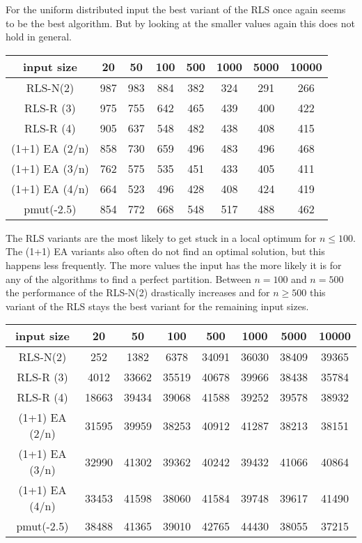 For the uniform distributed input the best variant of the RLS once again seems to be the best algorithm.
But by looking at the smaller values again this does not hold in general.

\begin{tabular}[h]{cccccccc}
      input size    & 20  & 50  & 100 & 500 & 1000 & 5000 & 10000 \\\hline
      RLS-N(2)      & 987 & 983 & 884 & 382 & 324  & 291  & 266   \\
      RLS-R (3)      & 975 & 755 & 642 & 465 & 439  & 400  & 422   \\
      RLS-R (4)      & 905 & 637 & 548 & 482 & 438  & 408  & 415   \\
      (1+1) EA (2/n) & 858 & 730 & 659 & 496 & 483  & 496  & 468   \\
      (1+1) EA (3/n) & 762 & 575 & 535 & 451 & 433  & 405  & 411   \\
      (1+1) EA (4/n) & 664 & 523 & 496 & 428 & 408  & 424  & 419   \\
      pmut(-2.5)    & 854 & 772 & 668 & 548 & 517  & 488  & 462   \\
\end{tabular}

The RLS variants are the most likely to get stuck in a local optimum for $n\le100$. The (1+1) EA variants also often do not find an optimal solution, but this happens less frequently. The more values the input has the more likely it is for any of the algorithms to find a perfect partition. Between $n=100$ and $n=500$ the performance of the RLS-N(2) drastically increases and for $n\ge500$ this variant of the RLS stays the best variant for the remaining input sizes.

\begin{tabular}[h]{cccccccc}
      input size    & 20    & 50    & 100   & 500   & 1000  & 5000  & 10000 \\\hline
      RLS-N(2)      & 252   & 1382  & 6378  & 34091 & 36030 & 38409 & 39365 \\
      RLS-R (3)      & 4012  & 33662 & 35519 & 40678 & 39966 & 38438 & 35784 \\
      RLS-R (4)      & 18663 & 39434 & 39068 & 41588 & 39252 & 39578 & 38932 \\
      (1+1) EA (2/n) & 31595 & 39959 & 38253 & 40912 & 41287 & 38213 & 38151 \\
      (1+1) EA (3/n) & 32990 & 41302 & 39362 & 40242 & 39432 & 41066 & 40864 \\
      (1+1) EA (4/n) & 33453 & 41598 & 38060 & 41584 & 39748 & 39617 & 41490 \\
      pmut(-2.5)    & 38488 & 41365 & 39010 & 42765 & 44430 & 38055 & 37215 \\
\end{tabular}

